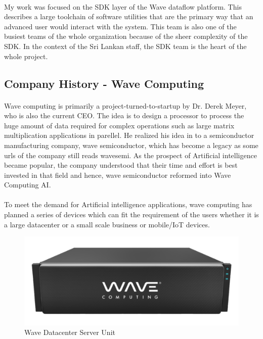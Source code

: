 \paragraph{}
My work was focused on the SDK layer of the Wave dataflow platform. This describes a large toolchain of software utilities that are the primary way that an advanced user would interact with the system. This team is also one of the busiest teams of the whole organization because of the sheer complexity of the SDK. In the context of the Sri Lankan staff, the SDK team is the heart of the whole project.


\subsection{Company History - Wave Computing}

\paragraph{}
Wave computing is primarily a project-turned-to-startup by Dr. Derek Meyer, who is also the current CEO. The idea is to design a processor to process the huge amount of data required for complex operations such as large matrix multiplication applications in parellel. He realized his idea in to a semiconductor manufacturing company, wave semiconductor, which has become a legacy as some urls of the company still reads wavesemi. As the prospect of Artificial intelligence became popular, the company understood that their time and effort is best invested in that field and hence, wave semiconductor reformed into Wave Computing AI.

\paragraph{}
To meet the demand for Artificial intelligence applications, wave computing has planned a series of devices which can fit the requirement of the users whether it is a large datacenter or a small scale business or mobile/{IoT} devices.
\begin{figure}[h]
    \centering
    \includegraphics[trim=0cm 0cm 0cm 0cm, clip=true,scale=0.5]{figures/wave_server.png}
    \caption{Wave Datacenter Server Unit\label{Fig:waveserver}}\vspace{-4mm}
    \end{figure}

